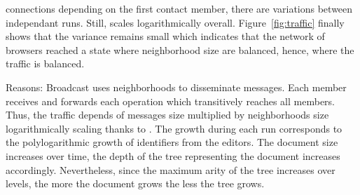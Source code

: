 \begin{asparadesc}
  connections depending on the first contact member, there are variations
  between independant runs. Still, \SPRAY scales logarithmically
  overall. Figure~\ref{fig:traffic} finally shows that the variance remains
  small which indicates that the network of browsers reached a state where
  neighborhood size are balanced, hence, where the traffic is balanced.
\item [Reasons:] Broadcast uses neighborhoods to disseminate messages. Each
  member receives and forwards each operation which transitively reaches all
  members. Thus, the traffic depends of messages size multiplied by
  neighborhoods size logarithmically scaling thanks to \SPRAY. The growth during
  each run corresponds to the polylogarithmic growth of identifiers from the
  editors. The document size increases over time, the depth of the \LSEQ tree
  representing the document increases accordingly. Nevertheless, since the
  maximum arity of the tree increases over levels, the more the document grows
  the less the tree grows.
\end{asparadesc}
